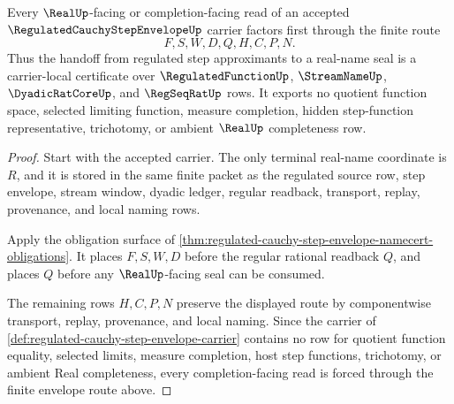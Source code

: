 \begin{theorem}
\label{thm:regulated-cauchy-step-envelope-real-completion-handoff}
Every $\RealUp$-facing or completion-facing read of an accepted $\RegulatedCauchyStepEnvelopeUp$ carrier factors first through the finite route
$$
F,S,W,D,Q,H,C,P,N .
$$
Thus the handoff from regulated step approximants to a real-name seal is a carrier-local certificate over $\RegulatedFunctionUp$, $\StreamNameUp$, $\DyadicRatCoreUp$, and $\RegSeqRatUp$ rows. It exports no quotient function space, selected limiting function, measure completion, hidden step-function representative, trichotomy, or ambient $\RealUp$ completeness row.
\end{theorem}
\begin{proof}
Start with the accepted carrier. The only terminal real-name coordinate is $R$, and it is stored in the same finite packet as the regulated source row, step envelope, stream window, dyadic ledger, regular readback, transport, replay, provenance, and local naming rows.

Apply the obligation surface of \autoref{thm:regulated-cauchy-step-envelope-namecert-obligations}. It places $F,S,W,D$ before the regular rational readback $Q$, and places $Q$ before any $\RealUp$-facing seal can be consumed.

The remaining rows $H,C,P,N$ preserve the displayed route by componentwise transport, replay, provenance, and local naming. Since the carrier of \autoref{def:regulated-cauchy-step-envelope-carrier} contains no row for quotient function equality, selected limits, measure completion, host step functions, trichotomy, or ambient Real completeness, every completion-facing read is forced through the finite envelope route above.
\end{proof}



